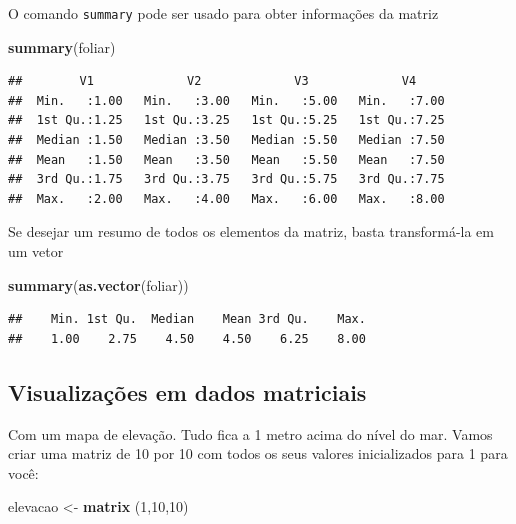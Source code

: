 \documentclass[
]{book}
\newenvironment{Shaded}{\begin{snugshade}}{\end{snugshade}}
\newcommand{\DecValTok}[1]{\textcolor[rgb]{0.00,0.00,0.81}{#1}}
\newcommand{\KeywordTok}[1]{\textcolor[rgb]{0.13,0.29,0.53}{\textbf{#1}}}
\newcommand{\NormalTok}[1]{#1}
\newcommand{\StringTok}[1]{\textcolor[rgb]{0.31,0.60,0.02}{#1}}
\begin{document}
O comando \texttt{summary} pode ser usado para obter informações da matriz

\begin{Shaded}
\begin{Highlighting}[]
\KeywordTok{summary}\NormalTok{(foliar)}
\end{Highlighting}
\end{Shaded}

\begin{verbatim}
##        V1             V2             V3             V4      
##  Min.   :1.00   Min.   :3.00   Min.   :5.00   Min.   :7.00  
##  1st Qu.:1.25   1st Qu.:3.25   1st Qu.:5.25   1st Qu.:7.25  
##  Median :1.50   Median :3.50   Median :5.50   Median :7.50  
##  Mean   :1.50   Mean   :3.50   Mean   :5.50   Mean   :7.50  
##  3rd Qu.:1.75   3rd Qu.:3.75   3rd Qu.:5.75   3rd Qu.:7.75  
##  Max.   :2.00   Max.   :4.00   Max.   :6.00   Max.   :8.00
\end{verbatim}

Se desejar um resumo de todos os elementos da matriz, basta transformá-la em um vetor

\begin{Shaded}
\begin{Highlighting}[]
\KeywordTok{summary}\NormalTok{(}\KeywordTok{as.vector}\NormalTok{(foliar))}
\end{Highlighting}
\end{Shaded}

\begin{verbatim}
##    Min. 1st Qu.  Median    Mean 3rd Qu.    Max. 
##    1.00    2.75    4.50    4.50    6.25    8.00
\end{verbatim}

\hypertarget{visualizauxe7uxf5es-em-dados-matriciais}{%
\subsection{Visualizações em dados matriciais}\label{visualizauxe7uxf5es-em-dados-matriciais}}

Com um mapa de elevação. Tudo fica a 1 metro acima do nível do mar. Vamos criar uma matriz de 10 por 10 com todos os seus valores inicializados para 1 para você:

\begin{Shaded}
\begin{Highlighting}[]
\NormalTok{elevacao <-}\StringTok{ }\KeywordTok{matrix}\NormalTok{ (}\DecValTok{1}\NormalTok{,}\DecValTok{10}\NormalTok{,}\DecValTok{10}\NormalTok{)}
\end{Highlighting}
\end{Shaded}
\end{document}
